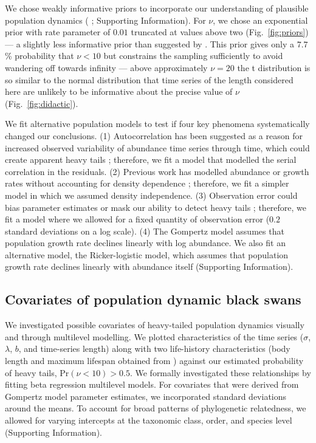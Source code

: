 We chose weakly informative priors to incorporate our understanding of
plausible population dynamics 
(\citeauthor{gelman2014} \citeyear{gelman2014}; Supporting Information). 
For $\nu$, we chose an exponential prior with rate parameter of $0.01$ truncated at
values above two (Fig.~\ref{fig:priors}) --- a slightly less informative prior
than suggested by \citet{fernandez1998}. This prior gives only a $7.7$\%
probability that $\nu < 10$ but constrains the sampling sufficiently to avoid
wandering off towards infinity --- above approximately $\nu = 20$ the
t distribution is so similar to the normal distribution that time series of the
length considered here are unlikely to be informative about the precise value
of $\nu$ (Fig.~\ref{fig:didactic}).

We fit alternative population models to test if four key phenomena
systematically changed our conclusions. (1) Autocorrelation has been suggested
as a reason for increased observed variability of abundance time series through
time, which could create apparent heavy tails \citep{inchausti2002}; therefore,
we fit a model that modelled the serial correlation in the residuals. (2)
Previous work has modelled abundance or growth rates without accounting for
density dependence \citep{halley2002,segura2013}; therefore, we fit a simpler
model in which we assumed density independence. (3) Observation error could
bias parameter estimates \citep{knape2012} or mask our ability to detect heavy
tails \citep{ward2007}; therefore, we fit a model where we allowed for a fixed
quantity of observation error ($0.2$ standard deviations on a log scale). (4)
The Gompertz model assumes that population growth rate declines linearly with
log abundance. We also fit an alternative model, the Ricker-logistic model,
which assumes that population growth rate declines linearly with abundance
itself (Supporting Information).

\subsection{Covariates of population dynamic black swans}

We investigated possible covariates of heavy-tailed population dynamics
visually and through multilevel modelling. We plotted characteristics of the
time series ($\sigma$, $\lambda$, $b$, and time-series length) along with two
life-history characteristics (body length and maximum lifespan obtained from
\citet{brook2006a}) against our estimated probability of heavy tails, Pr$(\nu
< 10) > 0.5$. We formally investigated these relationships by fitting beta
regression multilevel models. For covariates that were derived from Gompertz
model parameter estimates, we incorporated standard deviations around the
means. To account for broad patterns of phylogenetic relatedness, we allowed
for varying intercepts at the taxonomic class, order, and species level
(Supporting Information).

